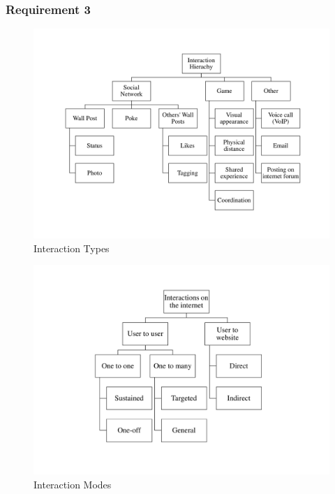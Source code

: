 \documentclass[12pt,a4paper]{article}
\begin{document}
\subsubsection{Requirement 3}
\begin{figure}[htb]
\begin{center}
\caption{Interaction Types}
\label{fig:types}
\includegraphics[width=6in]{InteractionTypes}
\end{center}
\end{figure}

\begin{figure}[htb]
\begin{center}
\caption{Interaction Modes}
\label{fig:modes}
\includegraphics[width=6in]{CategorisationsInteractions}
\end{center}
\end{figure}
\end{document}
